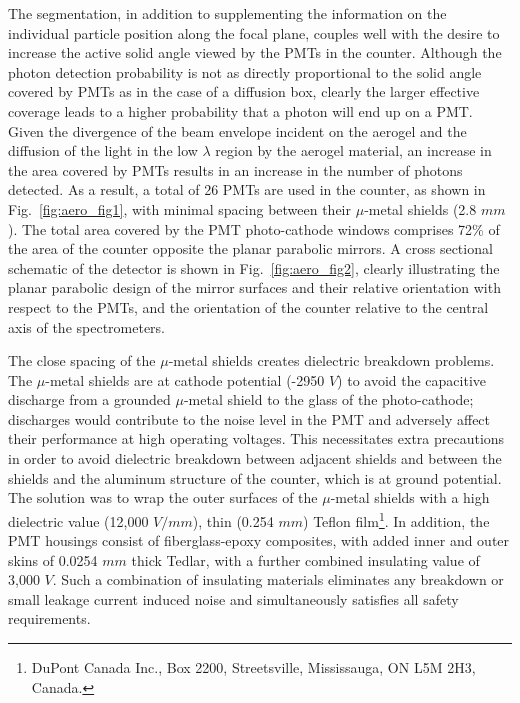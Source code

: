 {The segmentation, in addition to supplementing the information
on the individual particle position along the focal plane, couples well
with the desire to increase the active solid angle viewed by the PMTs
in the counter.  Although the photon detection probability is not as directly
proportional to the solid angle covered by PMTs as in the case of a diffusion
box, clearly the larger effective coverage leads to a higher probability
that a photon will end up on a PMT.  Given the divergence of the beam
envelope incident on the aerogel and the diffusion of the light in the low
$\lambda$ region by the aerogel material, an increase in the area covered by
PMTs results in an increase in the number of photons detected.  
As a result, a total of 26 PMTs are used in the counter, as shown in 
Fig.~\ref{fig:aero_fig1}, with minimal spacing between their $\mu$-metal shields 
(2.8 $mm$).  
The total area covered by the PMT photo-cathode windows comprises 72\% of the area 
of the counter opposite the planar parabolic mirrors.  
A cross sectional schematic of the detector is shown in Fig.~\ref{fig:aero_fig2}, 
clearly illustrating the planar parabolic design of the mirror surfaces and their 
relative orientation with respect to the PMTs, and the orientation of the counter 
relative to the central axis of the spectrometers. 
   
The close spacing of the $\mu$-metal shields
creates dielectric breakdown problems.  The $\mu$-metal
shields are at cathode potential (-2950 $V$) to avoid the capacitive discharge
from a grounded $\mu$-metal shield to the glass of the photo-cathode; discharges
would contribute to the noise level in the PMT and adversely affect their
performance at high operating voltages. This necessitates extra precautions in
order to avoid dielectric breakdown between adjacent shields and between the
shields and the aluminum structure of the counter, which is at ground
potential. The solution was to wrap the outer surfaces of the $\mu$-metal
shields with a high dielectric value (12,000 $V/mm$), thin (0.254 $mm$) Teflon
film\footnote{DuPont Canada Inc., Box 2200, Streetsville, Mississauga, ON L5M 2H3, Canada.}.
  In addition, the PMT housings consist of fiberglass-epoxy composites, 
with added inner and outer skins of 0.0254 $mm$ thick Tedlar\footnotemark[1],
with a further combined insulating value of 3,000 $V$.  
Such a combination of insulating materials eliminates any breakdown or small leakage
current induced noise and simultaneously satisfies all safety requirements.

}
